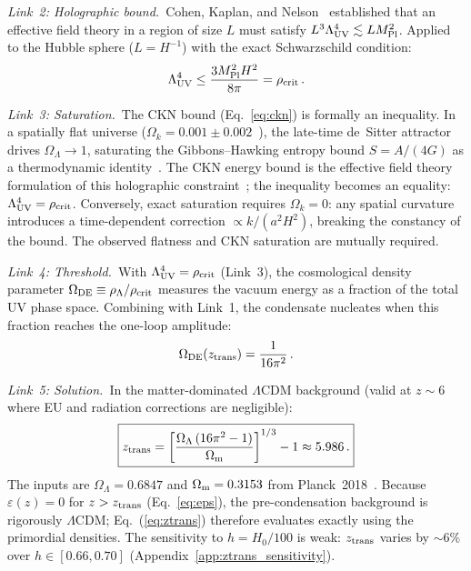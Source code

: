 \documentclass[a4paper,fleqn]{cas-dc}
\newcommand{\eps}{\varepsilon}
\newcommand{\ztrans}{z_{\rm trans}}
\newcommand{\OL}{\Omega_\Lambda}
\newcommand{\Om}{\Omega_{\rm m}}
\newcommand{\MPl}{M_{\rm Pl}}
\begin{document}
\textit{Link~2: Holographic bound.}~Cohen, Kaplan, and
Nelson~\cite{ckn1999} established that an effective field theory
in a region of size $L$ must satisfy
$L^3\Lambda_{\rm UV}^4 \lesssim L \MPl^2$. Applied to the Hubble
sphere ($L = H^{-1}$) with the exact Schwarzschild condition:
\begin{equation}
\Lambda_{\rm UV}^4 \leq
  \frac{3\MPl^2 H^2}{8\pi} = \rho_{\rm crit}\,.
\label{eq:ckn}
\end{equation}

\textit{Link~3: Saturation.}~The CKN bound
(Eq.~\ref{eq:ckn}) is formally an inequality. In a spatially
flat universe
($\Omega_k = 0.001 \pm 0.002$~\cite{planck2018}), the
late-time de~Sitter attractor drives
$\Omega_\Lambda \to 1$, saturating the Gibbons--Hawking
entropy bound $S = A/(4G)$ as a thermodynamic
identity~\cite{gibbons_hawking1977}. The CKN energy bound is
the effective field theory formulation of this holographic
constraint~\cite{ckn1999}; the inequality becomes an equality:
$\Lambda_{\rm UV}^4 = \rho_{\rm crit}$. Conversely, exact
saturation requires $\Omega_k = 0$: any spatial curvature
introduces a time-dependent correction
$\propto k/(a^2 H^2)$, breaking the constancy of the
bound. The observed flatness and CKN saturation are
mutually required.

\textit{Link~4: Threshold.}~With
$\Lambda_{\rm UV}^4 = \rho_{\rm crit}$ (Link~3), the
cosmological density parameter
$\Omega_{\rm DE} \equiv \rho_\Lambda/\rho_{\rm crit}$
measures the vacuum energy as a fraction of the total UV
phase space. Combining with Link~1, the condensate
nucleates when this fraction reaches the one-loop
amplitude:
\begin{equation}
\Omega_{\rm DE}(\ztrans) = \frac{1}{16\pi^2}\,.
\label{eq:threshold}
\end{equation}

\textit{Link~5: Solution.}~In the matter-dominated $\Lambda$CDM
background (valid at $z \sim 6$ where EU and radiation corrections
are negligible):
\begin{equation}
\boxed{\ztrans = \left[
  \frac{\OL\,(16\pi^2 - 1)}{\Om}\right]^{1/3} - 1 \approx 5.986\,.}
\label{eq:ztrans}
\end{equation}
The inputs are $\OL = 0.6847$ and $\Om = 0.3153$ from
Planck~2018~\cite{planck2018}. Because $\eps(z) = 0$ for
$z > \ztrans$ (Eq.~\ref{eq:eps}), the pre-condensation background
is rigorously $\Lambda$CDM; Eq.~(\ref{eq:ztrans}) therefore evaluates
exactly using the primordial densities. The sensitivity to
$h = H_0/100$ is weak: $\ztrans$ varies by $\sim 6\%$ over
$h \in [0.66, 0.70]$
(Appendix~\ref{app:ztrans_sensitivity}).
\end{document}
